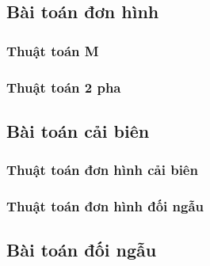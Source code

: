 \documentclass{article}
\begin{document}
\subsection{Bài toán đơn hình}
\subsubsection{Thuật toán  M}
\subsubsection{Thuật toán 2 pha}
\subsection{Bài toán cải biên}
\subsubsection{Thuật toán đơn hình cải biên}
\subsubsection{Thuật toán đơn hình đối ngẫu}
\subsection{Bài toán đối ngẫu}
\end{document}
